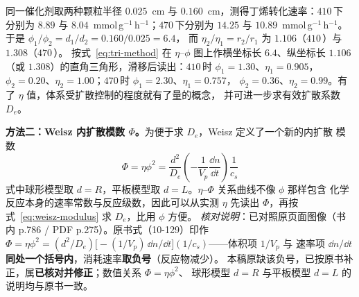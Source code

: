 \begin{example}
同一催化剂取两种颗粒半径 $0.025$~cm 与 $0.160$~cm，测得丁烯转化速率：$410$\,\degC 下
分别为 $8.89$ 与 $8.04$~mmol\,g$^{-1}$\,h$^{-1}$；$470$\,\degC 下分别为 $14.25$ 与
$10.89$~mmol\,g$^{-1}$\,h$^{-1}$。于是 $\phi_1/\phi_2=d_1/d_2=0.160/0.025=6.4$，
而 $\eta_2/\eta_1=r_2/r_1$ 为 $1.106$（$410$\,\degC）与 $1.308$（$470$\,\degC）。
按式~\eqref{eq:tri-method} 在 $\eta$–$\phi$ 图上作横坐标长 $6.4$、纵坐标长 $1.106$
（或 $1.308$）的直角三角形，滑移后读出：$410$\,\degC 时 $\phi_1=1.30$、$\eta_1=0.905$，
$\phi_2=0.20$、$\eta_2=1.00$；$470$\,\degC 时 $\phi_1=2.30$、$\eta_1=0.757$，
$\phi_2=0.36$、$\eta_2=0.99$。有了 $\eta$ 值，体系受扩散控制的程度就有了量的概念，
并可进一步求有效扩散系数 $D_e$。
\end{example}

\begin{principle}
\textbf{方法二：Weisz 内扩散模数 $\Phi$。}为便于求 $D_e$，Weisz 定义了一个新的内扩散
模数
\begin{equation}
\Phi=\eta\phi^{2}=\frac{d^{2}}{D_e}
\left(-\frac{1}{V_p}\frac{\dd n}{\dd t}\right)\frac{1}{c_s}
\label{eq:weisz-modulus}
\end{equation}
式中球形模型取 $d=R$，平板模型取 $d=L$。$\eta$–$\Phi$ 关系曲线不像 $\phi$ 那样包含
化学反应本身的速率常数与反应级数，因此可以从实测 $\eta$ 先读出 $\Phi$，再按
式~\eqref{eq:weisz-modulus} 求 $D_e$，比用 $\phi$ 方便。
\emph{核对说明}：已对照原页面图像（书内 p.786 / PDF p.275）。原书式（10-129）印作
$\Phi=\eta\phi^{2}=(d^{2}/D_e)\big[-(1/V_p)\,\dd n/\dd t\big](1/c_s)$——体积项 $1/V_p$ 与
速率项 $\dd n/\dd t$ \textbf{同处一个括号内}，消耗速率\textbf{取负号}（反应物减少）。
本稿原缺该负号，已按原书补正，属\textbf{已核对并修正}；数值关系 $\Phi=\eta\phi^{2}$、
球形模型 $d=R$ 与平板模型 $d=L$ 的说明均与原书一致。
\end{principle}

